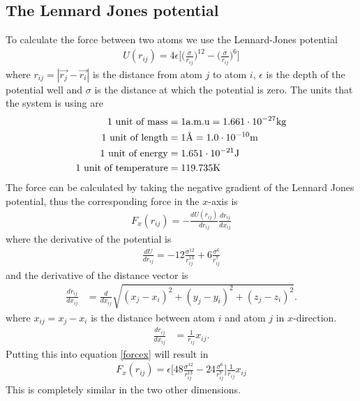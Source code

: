 \documentclass{article}
\begin{document}
\subsection{The Lennard Jones potential}

To calculate the force between two atoms we use the Lennard-Jones potential
\begin{align}
	U(r_{ij})=4\epsilon\Big[\Big(\frac{\sigma}{r_{ij}}\Big)^{12}-\Big(\frac{\sigma}{r_{ij}}\Big)^{6}\Big]
\end{align}
where $r_{ij}=|\vec{r_j}-\vec{r_i}|$ is the distance from atom $j$ to atom $i$, $\epsilon$ is the depth of the potential well and $\sigma$ is the distance at which the potential is zero. The units that the system is using are
\begin{align}
	1 \textnormal{ unit of mass} &= 1 \textnormal{a.m.u} = 1.661\cdot 10^{-27} \textnormal{kg}\\
	1 \textnormal{ unit of length} &= 1 \textnormal{Å} = 1.0\cdot 10^{-10} \textnormal{m}\\
	1 \textnormal{ unit of energy} &= 1.651\cdot 10^{-21}\textnormal{J}\\
	1 \textnormal{ unit of temperature} &= 119.735\textnormal{K}
\end{align}
The force can be calculated by taking the negative gradient of the Lennard Jones potential, thus the corresponding force in the $x$-axis is
\begin{align}
	F_x(r_{ij}) = - \frac{dU(r_{ij})}{dr_{ij}}\frac{dr_{ij}}{dx_{ij}}
	\label{forcex}
\end{align}
where the derivative of the potential is
\begin{align}
	\frac{dU}{dr_{ij}}=-12\frac{\sigma^12}{r_{ij}^{13}} + 6 \frac{\sigma^6}{r_{ij}^7}
\end{align}
and the derivative of the distance vector is
\begin{align}
	\frac{dr_{ij}}{dx_{ij}}&=\frac{d}{dx_{ij}}\sqrt{(x_j-x_i)^2+(y_j-y_i)^2+(z_j-z_i)^2}.
\end{align}
where $x_{ij}=x_j-x_i$ is the distance between atom $i$ and atom $j$ in $x$-direction.
\begin{align}
	\frac{dr_{ij}}{dx_{ij}}&=\frac{1}{r_{ij}}x_{ij}.
\end{align}
Putting this into equation \ref{forcex} will result in
\begin{align}
	F_x(r_{ij})= \epsilon \Big[48\frac{\sigma^{12}}{r_{ij}^{13}} - 24 \frac{\sigma^6}{r_{ij}^7}\Big]\frac{1}{r_{ij}}x_{ij}
\end{align}
This is completely similar in the two other dimensions.
\end{document}
